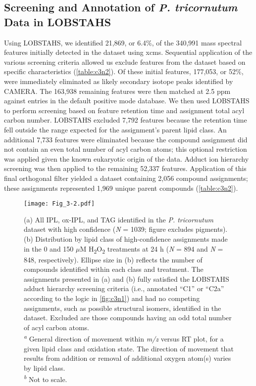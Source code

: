 \subsection{Screening and Annotation of \emph{P. tricornutum} Data in LOBSTAHS}

Using LOBSTAHS, we identified 21,869, or 6.4\%, of the 340,991 mass spectral features initially detected in the dataset using xcms. Sequential application of the various screening criteria allowed us exclude features from the dataset based on specific characteristics (\autoref{table:c3n2}). Of these initial features, 177,053, or 52\%, were immediately eliminated as likely secondary isotope peaks identified by CAMERA. The 163,938 remaining features were then matched at 2.5 ppm against entries in the default positive mode database. We then used LOBSTAHS to perform screening based on feature retention time and assignment total acyl carbon number. LOBSTAHS excluded 7,792 features because the retention time fell outside the range expected for the assignment's parent lipid class. An additional 7,733 features were eliminated because the compound assignment did not contain an even total number of acyl carbon atoms; this optional restriction was applied given the known eukaryotic origin of the data. Adduct ion hierarchy screening was then applied to the remaining 52,337 features. Application of this final orthogonal filter yielded a dataset containing 2,056 compound assignments; these assignments represented 1,969 unique parent compounds (\autoref{table:c3n2}).

\begin{SCfigure}[1][!t]
\centering
\texttt{[image: Fig\_3-2.pdf]}
\caption[IPL, ox-IPL, and TAG identified in the \emph{P. tricornutum} dataset]{(a) All IPL, ox-IPL, and TAG identified in the \emph{P. tricornutum} dataset with high confidence (\emph{N} = 1039; figure excludes pigments). (b) Distribution by lipid class of high-confidence assignments made in the 0 and 150 $\mu$M H\textsubscript{2}O\textsubscript{2} treatments at 24 h (\emph{N} = 894 and \emph{N} = 848, respectively). Ellipse size in (b) reflects the number of compounds identified within each class and treatment. The assignments presented in (a) and (b) fully satisfied the LOBSTAHS adduct hierarchy screening criteria (i.e., annotated ``C1'' or ``C2a'' according to the logic in \autoref{fig:c3n1}) and had no competing assignments, such as possible structural isomers, identified in the dataset. Excluded are those compounds having an odd total number of acyl carbon atoms.\\
\emph{\textsuperscript{a}} General direction of movement within \emph{m/z} versus RT plot, for a given lipid class and oxidation state. The direction of movement that results from addition or removal of additional oxygen atom(s) varies by lipid class.\\
\emph{\textsuperscript{b}} Not to scale.}
\label{fig:c3n2}
\end{SCfigure}

